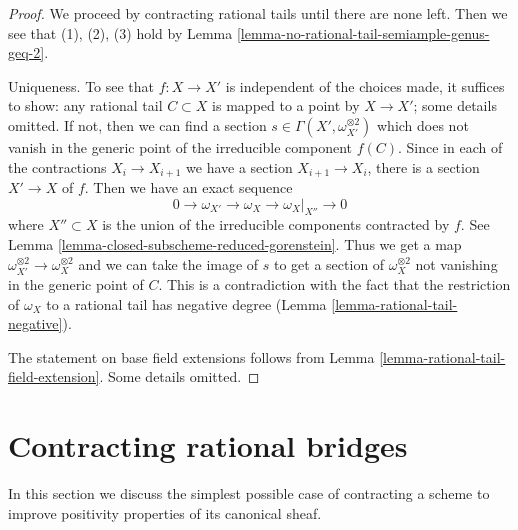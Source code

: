 \begin{proof}
We proceed by contracting rational tails until there are none
left. Then we see that (1), (2), (3) hold by
Lemma \ref{lemma-no-rational-tail-semiample-genus-geq-2}.

\medskip\noindent
Uniqueness. To see that $f : X \to X'$ is independent of the choices
made, it suffices to show: any rational tail $C \subset X$ is
mapped to a point by $X \to X'$; some details omitted.
If not, then we can find a section
$s \in \Gamma(X', \omega_{X'}^{\otimes 2})$ which does
not vanish in the generic point of the irreducible component $f(C)$.
Since in each of the contractions $X_i \to X_{i + 1}$
we have a section $X_{i + 1} \to X_i$, there is a section
$X' \to X$ of $f$. Then we have an exact sequence
$$
0 \to \omega_{X'} \to \omega_X \to \omega_X|_{X''} \to 0
$$
where $X'' \subset X$ is the union of the irreducible components
contracted by $f$. See Lemma \ref{lemma-closed-subscheme-reduced-gorenstein}.
Thus we get a map $\omega_{X'}^{\otimes 2} \to \omega_X^{\otimes 2}$
and we can take the image of $s$ to get a section of
$\omega_X^{\otimes 2}$ not vanishing in the generic point of $C$.
This is a contradiction with the fact that the restriction of
$\omega_X$ to a rational tail has negative degree
(Lemma \ref{lemma-rational-tail-negative}).

\medskip\noindent
The statement on base field extensions follows from
Lemma \ref{lemma-rational-tail-field-extension}. Some details omitted.
\end{proof}





\section{Contracting rational bridges}
\label{section-contracting-rational-bridges}

\noindent
In this section we discuss the simplest possible case of contracting
a scheme to improve positivity properties of its canonical sheaf.

